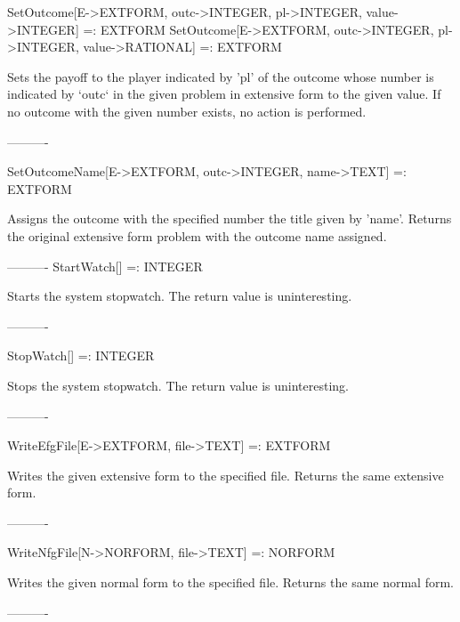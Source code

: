 SetOutcome[E->EXTFORM, outc->INTEGER, pl->INTEGER, value->INTEGER] =: EXTFORM
SetOutcome[E->EXTFORM, outc->INTEGER, pl->INTEGER, value->RATIONAL] =: EXTFORM

	Sets the payoff to the player indicated by 'pl' of the outcome whose 
number is indicated by `outc` in the given problem in extensive form to the
given value.  If no outcome with the given number exists, no action is 
performed. 

----------

SetOutcomeName[E->EXTFORM, outc->INTEGER, name->TEXT] =: EXTFORM

	Assigns the outcome with the specified number the title given by 
'name'.  Returns the original extensive form problem with the outcome name 
assigned.

----------
StartWatch[] =: INTEGER

	Starts the system stopwatch.  The return value is uninteresting.

----------

StopWatch[] =: INTEGER

	Stops the system stopwatch.  The return value is uninteresting.

----------

WriteEfgFile[E->EXTFORM, file->TEXT] =: EXTFORM

	Writes the given extensive form to the specified file.  Returns the
same extensive form.

----------

WriteNfgFile[N->NORFORM, file->TEXT] =: NORFORM

	Writes the given normal form to the specified file.  Returns the
same normal form.

----------





























